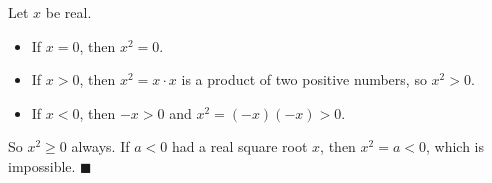 Let $x$ be real.
\begin{itemize}
\item If $x=0$, then $x^2=0$.
\item If $x>0$, then $x^2=x\cdot x$ is a product of two positive numbers, so $x^2>0$.
\item If $x<0$, then $-x>0$ and $x^2=(-x)(-x)>0$.
\end{itemize}
So $x^2\ge0$ always. If $a<0$ had a real square root $x$, then $x^2=a<0$, which is impossible. $\blacksquare$
